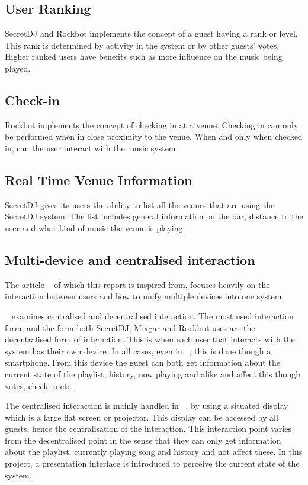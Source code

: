 \subsection{User Ranking}
SecretDJ and Rockbot implements the concept of a guest having a rank or
level. This rank is determined by activity in the system or by other
guests' votes. Higher ranked users have benefits such as more influence on the music being played.

\subsection{Check-in}
Rockbot implements the concept of checking in at a venue. Checking in
can only be performed when in close proximity to the venue. When and
only when checked in, can the user interact with the music system.

\subsection{Real Time Venue Information}
SecretDJ gives its users the ability to list all the venues that are
using the SecretDJ system. The list includes general information on
the bar, distance to the user and what kind of music the venue is
playing.

\subsection{Multi-device and centralised interaction}
\label{MDCI}
The article ~\cite{sorensen2012} of which this report is inspired from, focuses heavily on the interaction between users and how to unify multiple devices into one system.

~\cite{sorensen2012} examines centralised and
decentralised interaction. The most used interaction form, and the
form both SecretDJ, Mixgar and Rockbot uses are the decentralised form
of interaction. This is when each user that interacts with the system
has their own device. In all cases, even in
~\cite{sorensen2012}, this is done though a
smartphone. From this device the guest can both get information about
the current state of the playlist, history, now playing and alike and
affect this though votes, check-in etc.

The centralised interaction is mainly handled in
~\cite{sorensen2012}, by using a situated
display which is a large flat screen or projector. This display can be
accessed by all guests, hence the centralisation of the
interaction. This interaction point varies from the decentralised
point in the sense that they can only get information about the
playlist, currently playing song and history and not affect these. In
this project, a presentation interface is introduced to perceive the
current state of the system.
